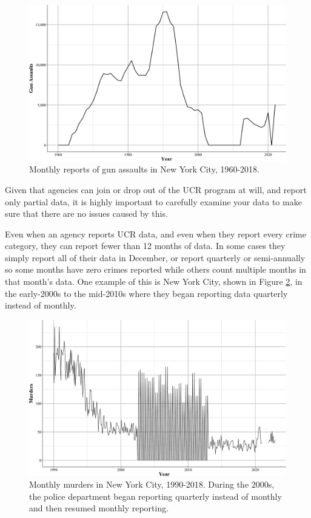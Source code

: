 \documentclass[
  12pt,
  openany]{book}
\begin{document}
\begin{figure}

{\centering \includegraphics[width=0.9\linewidth]{ucrbook_files/figure-latex/nycGunAssaults-1} 

}

\caption{Monthly reports of gun assaults in New York City, 1960-2018.}\label{fig:nycGunAssaults}
\end{figure}

Given that agencies can join or drop out of the UCR program at will, and report only partial data, it is highly important to carefully examine your data to make sure that there are no issues caused by this.

Even when an agency reports UCR data, and even when they report every crime category, they can report fewer than 12 months of data. In some cases they simply report all of their data in December, or report quarterly or semi-annually so some months have zero crimes reported while others count multiple months in that month's data. One example of this is New York City, shown in Figure \ref{fig:nycMurderMonthly}, in the early-2000s to the mid-2010s where they began reporting data quarterly instead of monthly.

\begin{figure}

{\centering \includegraphics[width=0.9\linewidth]{ucrbook_files/figure-latex/nycMurderMonthly-1} 

}

\caption{Monthly murders in New York City, 1990-2018. During the 2000s, the police department began reporting quarterly instead of monthly and then resumed monthly reporting.}\label{fig:nycMurderMonthly}
\end{figure}
\end{document}
